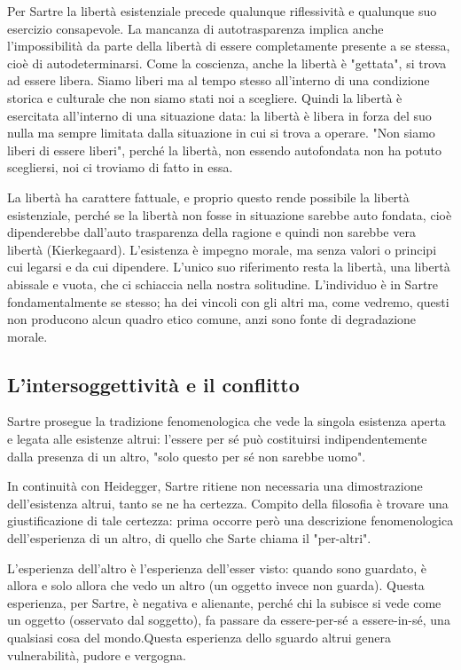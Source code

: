 Per Sartre la libertà
esistenziale precede qualunque riflessività e qualunque
suo esercizio consapevole.
La mancanza di autotrasparenza implica anche
l'impossibilità da parte della libertà di essere
completamente presente a se stessa, cioè di
autodeterminarsi. Come la coscienza, anche la
libertà è "gettata", si trova ad essere libera.
Siamo liberi ma al tempo stesso all'interno
di una condizione storica e culturale che non
siamo stati noi a scegliere. Quindi la libertà
è esercitata all'interno di una situazione
data: la libertà è libera in forza del suo
nulla ma sempre limitata dalla situazione in
cui si trova a operare.
"Non siamo liberi di essere liberi", perché la
libertà, non essendo autofondata non ha potuto
scegliersi, noi ci troviamo di fatto in essa.

La libertà ha carattere fattuale, e proprio questo
rende possibile la libertà esistenziale, perché se
la libertà non fosse in situazione sarebbe
auto fondata, cioè dipenderebbe dall'auto trasparenza
della ragione e quindi non sarebbe vera libertà (Kierkegaard).
L'esistenza è impegno morale, ma senza valori
o principi cui legarsi e da cui dipendere.
L'unico suo riferimento resta la libertà, una
libertà abissale e vuota, che ci schiaccia nella nostra
solitudine. L'individuo è in Sartre
fondamentalmente se stesso; ha dei vincoli con gli
altri ma, come vedremo, questi non producono
alcun quadro etico comune, anzi sono fonte
di degradazione morale.

\subsection{L'intersoggettività e il conflitto}

Sartre prosegue la tradizione fenomenologica che vede la singola esistenza aperta e legata alle esistenze altrui: l'essere per sé può costituirsi indipendentemente dalla presenza di un altro, "solo questo per sé non sarebbe uomo".

In continuità con Heidegger, Sartre ritiene non necessaria una dimostrazione dell'esistenza altrui, tanto se ne ha certezza.
Compito della filosofia è trovare una giustificazione di tale certezza: prima occorre però una descrizione fenomenologica dell'esperienza di un altro, di quello che Sarte chiama il "per-altri".

L'esperienza dell'altro è l'esperienza dell'esser visto: quando sono guardato, è allora e solo allora che vedo un altro (un oggetto invece non guarda). Questa esperienza, per Sartre, è negativa e alienante, perché chi la subisce si vede come un oggetto (osservato dal soggetto), fa passare da essere-per-sé a essere-in-sé, una qualsiasi cosa del mondo.Questa esperienza dello sguardo altrui genera vulnerabilità, pudore e vergogna.

